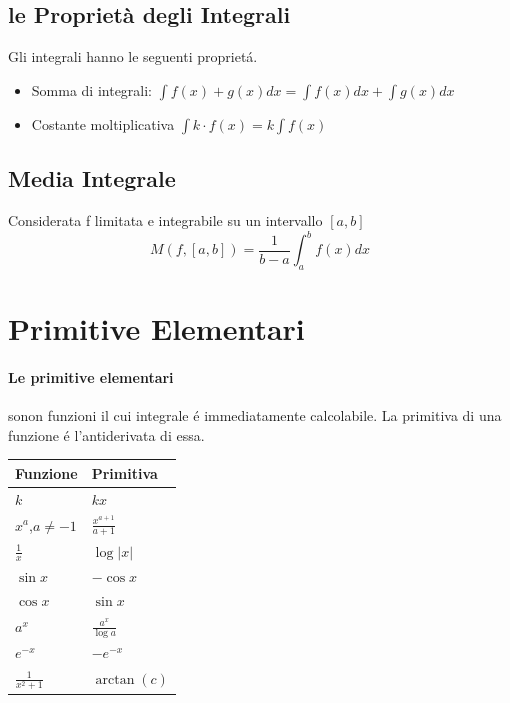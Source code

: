 \documentclass[12pt, a4paper, openany]{book}
\begin{document}
\subsection{le Proprietà degli Integrali}
Gli integrali hanno le seguenti proprietá.	
\begin{itemize}
	\item Somma di integrali: $\int f(x)+g(x) dx = \int f(x) dx + \int g(x) dx$
	\item Costante moltiplicativa $\int k \cdot f(x) = k \int f(x)$
\end{itemize}

\subsection{Media Integrale}
Considerata f limitata e integrabile su un intervallo $[a,b]$
\begin{equation*}
	M(f,[a,b])=\frac{1}{b-a}\int_a^b f(x)dx
\end{equation*}

\section{Primitive Elementari}
\paragraph{Le primitive elementari} sonon funzioni il cui integrale é immediatamente calcolabile.
La primitiva di una funzione é l'antiderivata di essa.

\begin{tabularx}{\textwidth}{ |Y|Y| }
	\hline
	\textbf{Funzione} & \textbf{Primitiva}    \\
	\hline
	$k$               & $kx$                  \\
	$x^a$,$a\neq-1$   & $\frac{x^{a+1}}{a+1}$ \\
	$\frac{1}{x}$     & $\log|x|$             \\
	$\sin x$          & $-\cos x$             \\
	$\cos x $         & $\sin x$              \\
	$a^x$             & $\frac{a^x}{\log a}$  \\
	\hline
	$e^{-x}$          & $-e^{-x}$             \\
	$\frac{1}{x^2+1}$ & $\arctan (c)$         \\
	\hline
\end{tabularx}
\end{document}

